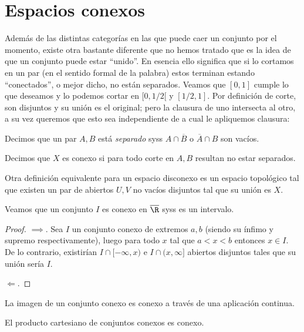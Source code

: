\documentclass[11pt,oneside,a4paper]{book}
\begin{document}
\section{Espacios conexos}
Además de las distintas categorías en las que puede caer un conjunto por el momento, existe otra bastante diferente que no hemos tratado que es la idea de que un conjunto puede estar ``unido''. En esencia ello significa que si lo cortamos en un par (en el sentido formal de la palabra) estos terminan estando ``conectados'', o mejor dicho, no están separados. Veamos que $[0,1]$ cumple lo que deseamos y lo podemos cortar en $[0,1/2[$ y $[1/2,1]$. Por definición de corte, son disjuntos y su unión es el original; pero la clausura de uno intersecta al otro, a su vez queremos que esto sea independiente de a cual le apliquemos clausura:
\begin{mydef}
Decimos que un par $A,B$ está \textit{separado} syss $A\cap\overline{B}$ o $\overline{A}\cap B$ son vacíos.

Decimos que $X$ es conexo si para todo corte en $A,B$ resultan no estar separados.
\end{mydef}
Otra definición equivalente para un espacio disconexo es un espacio topológico tal que existen un par de abiertos $U,V$ no vacíos disjuntos tal que su unión es $X$.
\begin{thm}
Veamos que un conjunto $I$ es conexo en $\overline{\R}$ syss es un intervalo.
\end{thm}
\begin{proof}
$\implies$. Sea $I$ un conjunto conexo de extremos $a,b$ (siendo su ínfimo y supremo respectivamente), luego para todo $x$ tal que $a\lt x\lt b$ entonces $x\in I$. De lo contrario, existirían $I\cap[-\infty, x)$ e $I\cap(x,\infty]$ abiertos disjuntos tales que su unión sería $I$.

$\Longleftarrow$.
\end{proof}
\begin{thm}
La imagen de un conjunto conexo es conexo a través de una aplicación continua.
\end{thm}
\begin{thm}
El producto cartesiano de conjuntos conexos es conexo.
\end{thm}
\end{document}
